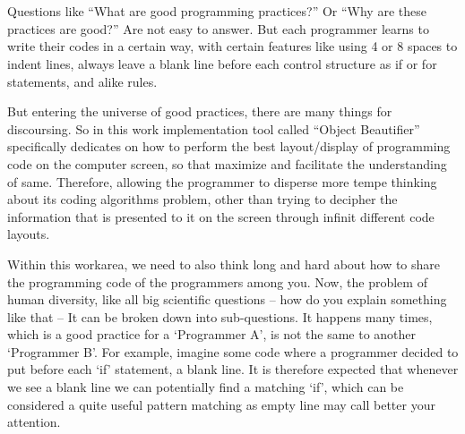 

%
\cleardoublepage
{}


\chapter{}


\chooselang
{
    Questions like ``What are good programming practices?'' Or ``Why are these practices are good?''
    Are not easy to answer. But each programmer learns to write their codes in a certain way, with
    certain features like using 4 or 8 spaces to indent lines, always leave a blank line before each
    control structure as if or for statements, and alike rules. %

    But entering the universe of good practices, there are many things for discoursing. So in this
    work implementation tool called ``Object Beautifier'' specifically dedicates on how to perform
    the best layout/display of programming code on the computer screen, so that maximize and
    facilitate the understanding of same. Therefore, allowing the programmer to disperse more tempe
    thinking about its coding algorithms problem, other than trying to decipher the information that
    is presented to it on the screen through infinit different code layouts. %

    Within this work\s area, we need to also think long and hard about how to share the programming
    code of the programmers among you. Now, the problem of human diversity, like all big scientific
    questions -- how do you explain something like that -- It can be broken down into sub-questions.
    It happens many times, which is a good practice for a `Programmer A', is not the same to another
    `Programmer B'. For example, imagine some code where a programmer decided to put before each
    `if' statement, a blank line. It is therefore expected that whenever we see a blank line we can
    potentially find a matching `if', which can be considered a quite useful pattern matching as
    empty line may call better your attention. %

}
